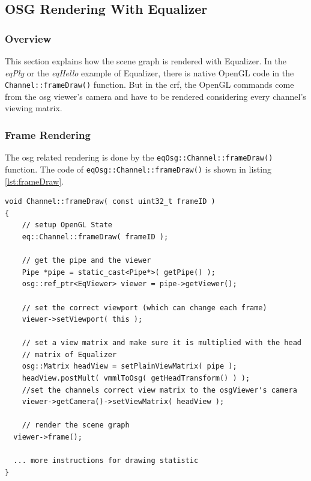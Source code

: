\subsection{OSG Rendering With Equalizer}
\subsubsection{Overview}
\label{sec:Overview}
This section explains how the scene graph is rendered with Equalizer. In the \emph{eqPly} or the \emph{eqHello} example of Equalizer, there is native OpenGL code in the \texttt{Channel::frameDraw()} function. But in the \gls{crf}, the OpenGL commands come from the \gls{osg} viewer's camera and have to be rendered considering every channel's viewing matrix. 

\subsubsection{Frame Rendering}
\label{sec:FrameRendering}
The \gls{osg} related rendering is done by the \texttt{eqOsg::Channel::frameDraw()} function. The code of \texttt{eqOsg::Channel::frameDraw()} is shown in listing \ref{lst:frameDraw}.

\begin{lstlisting}[caption={\texttt{Channel::frameDraw()}},label={lst:frameDraw}]
void Channel::frameDraw( const uint32_t frameID )
{
	// setup OpenGL State
	eq::Channel::frameDraw( frameID );
	
	// get the pipe and the viewer
	Pipe *pipe = static_cast<Pipe*>( getPipe() );
	osg::ref_ptr<EqViewer> viewer = pipe->getViewer();
	
	// set the correct viewport (which can change each frame)
	viewer->setViewport( this );
	
	// set a view matrix and make sure it is multiplied with the head
	// matrix of Equalizer
	osg::Matrix headView = setPlainViewMatrix( pipe );
	headView.postMult( vmmlToOsg( getHeadTransform() ) );
	//set the channels correct view matrix to the osgViewer's camera
	viewer->getCamera()->setViewMatrix( headView );
	
	// render the scene graph
  viewer->frame();
  
  ... more instructions for drawing statistic
}\end{lstlisting}

